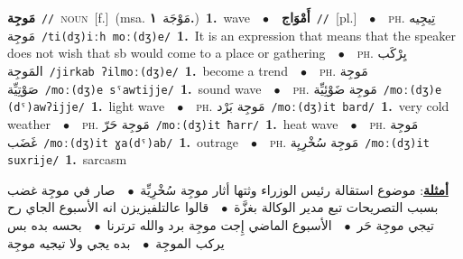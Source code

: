 \documentclass[10pt,a4paper,twoside]{article} %
\begin{document}
\begin{multicols}{2}
{\setlength\topsep{0pt}\textbf{\foreignlanguage{arabic}{مَوجِة}}\ {\color{gray}\texttt{//}\color{black}}\ \textsc{noun}\ [f.]\ \color{gray}(msa. \foreignlanguage{arabic}{مَوْجَة}~\foreignlanguage{arabic}{\textbf{١.}})\color{black}\ \textbf{1.}~wave\ \ $\bullet$\ \ \setlength\topsep{0pt}\textbf{\foreignlanguage{arabic}{أَمْوَاج}}\ {\color{gray}\texttt{//}\color{black}}\ [pl.]\ \ $\bullet$\ \ \textsc{ph.} \color{gray} \foreignlanguage{arabic}{تِيجِيه مَوجِة}\color{black}\ {\color{gray}\texttt{/{\sffamily ti(dʒ)iːh moː(dʒ)e}/}\color{black}}\ \textbf{1.}~It is an expression that means that the speaker does not wish that sb would come to a place or gathering\ \ $\bullet$\ \ \textsc{ph.} \color{gray} \foreignlanguage{arabic}{يِرْكَب المَوجِة}\color{black}\ {\color{gray}\texttt{/{\sffamily jirkab ʔilmoː(dʒ)e}/}\color{black}}\ \textbf{1.}~become a trend\ \ $\bullet$\ \ \textsc{ph.} \color{gray} \foreignlanguage{arabic}{مَوجِة صَوْتِيِّة}\color{black}\ {\color{gray}\texttt{/{\sffamily moː(dʒ)e sˤawtijje}/}\color{black}}\ \textbf{1.}~sound wave\ \ $\bullet$\ \ \textsc{ph.} \color{gray} \foreignlanguage{arabic}{مَوجِة ضَوْئِيِّة}\color{black}\ {\color{gray}\texttt{/{\sffamily moː(dʒ)e (dˤ)awʔijje}/}\color{black}}\ \textbf{1.}~light wave\ \ $\bullet$\ \ \textsc{ph.} \color{gray} \foreignlanguage{arabic}{مَوجِة بَرْد}\color{black}\ {\color{gray}\texttt{/{\sffamily moː(dʒ)it bard}/}\color{black}}\ \textbf{1.}~very cold weather\ \ $\bullet$\ \ \textsc{ph.} \color{gray} \foreignlanguage{arabic}{مَوجِة حَرّ}\color{black}\ {\color{gray}\texttt{/{\sffamily moː(dʒ)it ħarr}/}\color{black}}\ \textbf{1.}~heat wave\ \ $\bullet$\ \ \textsc{ph.} \color{gray} \foreignlanguage{arabic}{مَوجِة غَضَب}\color{black}\ {\color{gray}\texttt{/{\sffamily moː(dʒ)it ɣa(dˤ)ab}/}\color{black}}\ \textbf{1.}~outrage\ \ $\bullet$\ \ \textsc{ph.} \color{gray} \foreignlanguage{arabic}{مَوجِة سُخْرِيِة}\color{black}\ {\color{gray}\texttt{/{\sffamily moː(dʒ)it suxrije}/}\color{black}}\ \textbf{1.}~sarcasm\  \begin{flushright}\color{gray}\foreignlanguage{arabic}{\textbf{\underline{\foreignlanguage{arabic}{أمثلة}}}: موضوع استقالة رئيس الوزراء وثتها أثار موجِة سُخْرِيِّة\ $\bullet$\ \  صار في موجِة غضب بسبب التصريحات تبع مدير الوكالة بغزَّة\ $\bullet$\ \  قالوا عالتلفيزيزن انه الأسبوع الجاي رح تيجي موجِة حَر\ $\bullet$\ \  الأسبوع الماضي إِجت موجِة برد والله ترترنا\ $\bullet$\ \  بحسه بده بس يركب الموجِة\ $\bullet$\ \  بده يجي ولا تيجيه موجِة}\end{flushright}\color{black}} \vspace{2mm}


\end{multicols}
\end{document}
